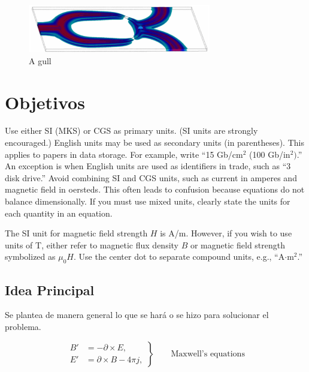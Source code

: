 \documentclass[a4paper]{IEEEtran} %
\begin{document}
\begin{figure}
    \centering
        \includegraphics[width=8cm]{imagenes/img2}
        \caption{A gull}
        \label{fig:gull}
\end{figure}

\section{Objetivos}
Use either SI (MKS) or CGS as primary units. (SI units are strongly 
encouraged.) English units may be used as secondary units (in parentheses). 
This applies to papers in data storage. For example, write ``15 
Gb/cm$^{2}$ (100 Gb/in$^{2})$.'' An exception is when 
English units are used as identifiers in trade, such as ``3  
disk drive.'' Avoid combining SI and CGS units, such as current in amperes 
and magnetic field in oersteds. This often leads to confusion because 
equations do not balance dimensionally. If you must use mixed units, clearly 
state the units for each quantity in an equation.

The SI unit for magnetic field strength $H$ is A/m. However, if you wish to use 
units of T, either refer to magnetic flux density $B$ or magnetic field 
strength symbolized as $\mu _{0}H$. Use the center dot to separate 
compound units, e.g., ``A$\cdot $m$^{2}$.''

\subsection{Idea Principal}

Se plantea de manera general lo que se hará o se hizo para solucionar el problema.

\begin{equation}
 \left.\begin{aligned}
        B'&=-\partial \times E,\\
        E'&=\partial \times B - 4\pi j,
       \end{aligned}
 \right\}
 \qquad \text{Maxwell's equations}
\end{equation}
\end{document}
